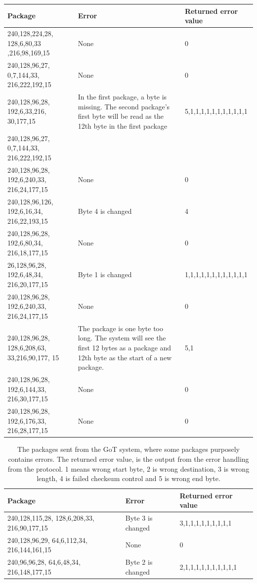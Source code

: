 \begin{table}[H]
\centering
\begin{tabular}{|p{3cm}|p{8cm}|p{4cm}|}
\hline
Package & Error & Returned error value \\
\hline
240,128,224,28, 128,6,80,33 ,216,98,169,15 & None & 0 \\
\hline
240,128,96,27, 0,7,144,33, 216,222,192,15 & None & 0 \\
\hline
240,128,96,28, 192,6,33,216, 30,177,15 & In the first package, a byte is missing. The second package's first byte will be read as the 12th byte in the first package & 5,1,1,1,1,1,1,1,1,1,1,1 \\
\cline{1-1}
240,128,96,27, 0,7,144,33, 216,222,192,15 & & \\
\hline
240,128,96,28, 192,6,240,33, 216,24,177,15 & None & 0 \\
\hline
240,128,96,126, 192,6,16,34, 216,22,193,15 & Byte 4 is changed & 4 \\
\hline
240,128,96,28, 192,6,80,34, 216,18,177,15 & None & 0 \\
\hline
26,128,96,28, 192,6,48,34, 216,20,177,15 & Byte 1 is changed & 1,1,1,1,1,1,1,1,1,1,1,1 \\
\hline
240,128,96,28, 192,6,240,33, 216,24,177,15 & None & 0 \\
\hline
240,128,96,28, 128,6,208,63, 33,216,90,177, 15 & The package is one byte too long. The system will see the first 12 bytes as a package and 12th byte as the start of a new package. & 5,1 \\
\hline
240,128,96,28, 192,6,144,33, 216,30,177,15 & None & 0 \\
\hline
240,128,96,28, 192,6,176,33, 216,28,177,15 & None & 0 \\
\hline
\end{tabular}
\end{table}

\begin{table}[H]
\centering
\begin{tabular}{|p{3cm}|p{8cm}|p{4cm}|}
\hline
Package & Error & Returned error value \\
\hline
240,128,115,28, 128,6,208,33, 216,90,177,15 & Byte 3 is changed & 3,1,1,1,1,1,1,1,1,1 \\
\hline
240,128,96,29, 64,6,112,34, 216,144,161,15 & None & 0 \\
\hline
240,96,96,28, 64,6,48,34, 216,148,177,15 & Byte 2 is changed & 2,1,1,1,1,1,1,1,1,1,1 \\
\hline
\end{tabular}
\caption{The packages sent from the GoT system, where some packages purposely contains errors. The returned error value, is the output from the error handling from the protocol. 1 means wrong start byte, 2 is wrong destination, 3 is wrong length, 4 is failed checksum control and 5 is wrong end byte.}
\label{AccT2tab}
\end{table}

